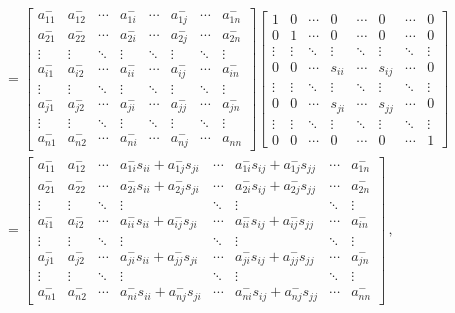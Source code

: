 \documentclass[11pt,english,a4paper]{article}
\begin{document}
\begin{flushleft}
\begin{align*}
\\ 
&= \begin{bmatrix} a_{11}^- & a_{12}^- & \cdots & a_{1i}^- & \cdots & a_{1j}^- & \cdots & a_{1n}^- \\ a_{21}^- & a_{22}^- & \cdots & a_{2i}^- & \cdots & a_{2j}^- & \cdots & a_{2n}^- \\ \vdots & \vdots & \ddots & \vdots & \ddots & \vdots & \ddots & \vdots \\ a_{i1}^- & a_{i2}^- & \cdots & a_{ii}^- & \cdots & a_{ij}^- & \cdots & a_{in}^- \\ \vdots & \vdots & \ddots & \vdots & \ddots & \vdots & \ddots & \vdots \\ a_{j1}^- & a_{j2}^- & \cdots & a_{ji}^- & \cdots & a_{jj}^- & \cdots & a_{jn}^- \\ \vdots & \vdots & \ddots & \vdots & \ddots & \vdots & \ddots & \vdots \\ a_{n1}^- & a_{n2}^- & \cdots & a_{ni}^- & \cdots & a_{nj}^- & \cdots &a_{nn}\end{bmatrix}\begin{bmatrix} 1 & 0 & \cdots & 0 & \cdots & 0 & \cdots & 0 \\ 0 & 1 & \cdots & 0 & \cdots & 0 & \cdots & 0 \\ \vdots & \vdots & \ddots & \vdots & \ddots & \vdots & \ddots & \vdots \\ 0 & 0 & \cdots & s_{ii} & \cdots & s_{ij} & \cdots & 0 \\ \vdots & \vdots & \ddots & \vdots & \ddots & \vdots & \ddots & \vdots \\ 0 & 0 & \cdots & s_{ji} & \cdots & s_{jj} & \cdots & 0 \\ \vdots & \vdots & \ddots & \vdots & \ddots & \vdots & \ddots & \vdots \\ 0 & 0 & \cdots & 0 & \cdots & 0 & \cdots & 1 \end{bmatrix}
\\
&= \begin{bmatrix} a_{11}^- & a_{12}^- & \cdots & a_{1i}^- s_{ii} + a_{1j}^- s_{ji} & \cdots & a_{1i}^- s_{ij} + a_{1j}^- s_{jj} & \cdots & a_{1n}^- \\  a_{21}^- & a_{22}^- & \cdots & a_{2i}^- s_{ii} + a_{2j}^- s_{ji} & \cdots & a_{2i}^- s_{ij} + a_{2j}^- s_{jj} & \cdots & a_{2n}^- \\ \vdots & \vdots & \ddots & \vdots & \ddots & \vdots & \ddots & \vdots \\  a_{i1}^- & a_{i2}^- & \cdots & a_{ii}^- s_{ii} + a_{ij}^- s_{ji} & \cdots & a_{ii}^- s_{ij} + a_{ij}^- s_{jj} & \cdots & a_{in}^- \\ \vdots & \vdots & \ddots & \vdots & \ddots & \vdots & \ddots & \vdots \\ a_{j1}^- & a_{j2}^- & \cdots & a_{ji}^- s_{ii} + a_{jj}^- s_{ji} & \cdots & a_{ji}^- s_{ij} + a_{jj}^- s_{jj} & \cdots & a_{jn}^- \\ \vdots & \vdots & \ddots & \vdots & \ddots & \vdots & \ddots & \vdots \\ a_{n1}^- & a_{n2}^- & \cdots & a_{ni}^- s_{ii} + a_{nj}^- s_{ji} & \cdots & a_{ni}^- s_{ij} + a_{nj}^- s_{jj} & \cdots & a_{nn}^-\end{bmatrix} \,,
\end{align*}


\end{flushleft}
\end{document}
